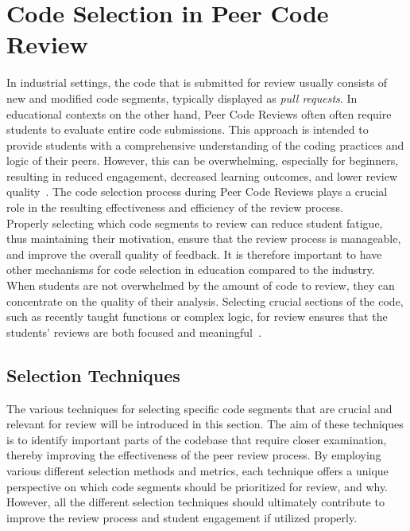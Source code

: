 \section{Code Selection in Peer Code Review}\label{code-selection-techniques}
In industrial settings, the code that is submitted for review usually consists of new and modified code segments, typically displayed as \textit{pull requests}. In educational contexts on the other hand, Peer Code Reviews often often require students to evaluate entire code submissions. This approach is intended to provide students with a comprehensive understanding of the coding practices and logic of their peers. However, this can be overwhelming, especially for beginners, resulting in reduced engagement, decreased learning outcomes, and lower review quality~\cite{Indriasari_Luxton_2020}. The code selection process during Peer Code Reviews plays a crucial role in the resulting effectiveness and efficiency of the review process. \\

Properly selecting which code segments to review can reduce student fatigue, thus maintaining their motivation, ensure that the review process is manageable, and improve the overall quality of feedback. It is therefore important to have other mechanisms for code selection in education compared to the industry. When students are not overwhelmed by the amount of code to review, they can concentrate on the quality of their analysis. Selecting crucial sections of the code, such as recently taught functions or complex logic, for review ensures that the students' reviews are both focused and meaningful~\cite{Indriasari_Luxton_2020, Song_Goldstein_Sakr_2020}.




\subsection{Selection Techniques}
The various techniques for selecting specific code segments that are crucial and relevant for review will be introduced in this section. The aim of these techniques is to identify important parts of the codebase that require closer examination, thereby improving the effectiveness of the peer review process. By employing various different selection methods and metrics, each technique offers a unique perspective on which code segments should be prioritized for review, and why. However, all the different selection techniques should ultimately contribute to improve the review process and student engagement if utilized properly. \\

